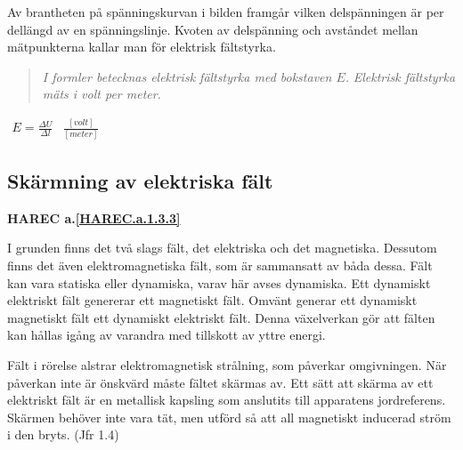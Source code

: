 Av brantheten på spänningskurvan i bilden framgår vilken delspänningen är per
dellängd av en spänningslinje. Kvoten av delspänning och avståndet mellan
mätpunkterna kallar man för elektrisk fältstyrka.

\begin{quote}
\emph{I formler betecknas elektrisk fältstyrka med bokstaven \(E\).}
\emph{Elektrisk fältstyrka mäts i volt per meter.}
\end{quote}

\(
\begin{array}{cc}
E=\frac{\Delta U}{\Delta l} & \frac{[volt]}{[meter]}
\end{array}
\)

\subsection{Skärmning av elektriska fält}
\textbf{HAREC a.\ref{HAREC.a.1.3.3}\label{myHAREC.a.1.3.3}}

I grunden finns det två slags fält, det elektriska och det magnetiska. Dessutom
finns det även elektromagnetiska fält, som är sammansatt av båda dessa. Fält
kan vara statiska eller dynamiska, varav här avses dynamiska. Ett dynamiskt
elektriskt fält genererar ett magnetiskt fält. Omvänt generar ett dynamiskt
magnetiskt fält ett dynamiskt elektriskt fält. Denna växelverkan gör att fälten
kan hållas igång av varandra med tillskott av yttre energi.

Fält i rörelse alstrar elektromagnetisk strålning, som påverkar omgivningen. När
påverkan inte är önskvärd måste fältet skärmas av. Ett sätt att skärma av ett
elektriskt fält är en metallisk kapsling som anslutits till apparatens
jordreferens. Skärmen behöver inte vara tät, men utförd så att all magnetiskt
inducerad ström i den bryts. (Jfr 1.4)
